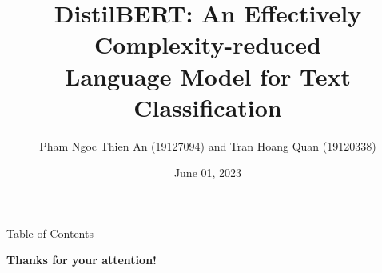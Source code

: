 \documentclass[10pt, aspectratio=149]{beamer}
\title[DistilBERT for Text Classification]{DistilBERT: An Effectively Complexity-reduced \\ Language Model for Text Classification}
\author[PNTAn and THQuan]{Pham Ngoc Thien An (19127094) and Tran Hoang Quan (19120338)}
\institute[fit@hcmus]{VNUHCM - University of Science}
\date{June 01, 2023}
\begin{document}
\maketitle

\begin{frame}{Table of Contents}
\tableofcontents
\end{frame}









\begin{frame}[plain]
\centering
\Huge{\textbf{Thanks for your attention!}}
\end{frame}
\end{document}
